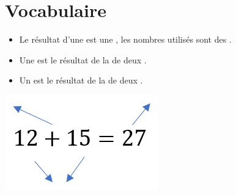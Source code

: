 \documentclass[xcolor={dvipsnames}]{beamer}
\begin{document}
\section{Vocabulaire}

\begin{frame}
	\begin{mydefs}
		
		\begin{itemize}
		
		
			\item Le résultat d'une  est une , les nombres utilisés sont des .\pause
			
			\item Une  est le résultat de la  de deux .\pause
			
			\item Un  est le résultat de la  de deux .\pause
		\end{itemize}
	\end{mydefs}

	\vspace*{1.5cm}
	\begin{center}
		\includegraphics[scale=0.8]{somme2}
	\end{center}
\end{frame}
\end{document}
